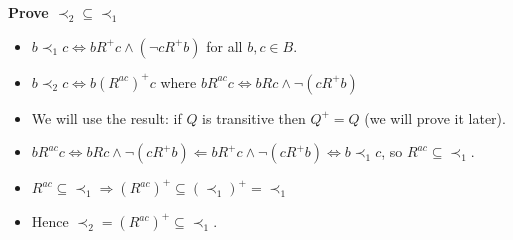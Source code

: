 \documentclass[letterpaper, 8pt]{extarticle}
\begin{document}
\begin{multicols*}{3}
    \textbf{Prove $\prec_2 \subseteq \prec_1$}
    \begin{itemize}
        \item
              $b \prec_1 c \Leftrightarrow bR^+ c \land (\lnot c R^+ b)$ for all $b, c \in B$.
        \item
              $b \prec_2 c \Leftrightarrow b(R^{ac})^+ c$ where $bR^{ac}c \Leftrightarrow bRc \land \lnot (c R^+ b)$
        \item
              We will use the result: if $Q$ is transitive then $Q^+ = Q$ (we will prove it later).
        \item
              $bR^{ac} c \Leftrightarrow bRc \land \lnot (c R^+ b) \Leftarrow bR^+ c \land \lnot (c R^+ b) \Leftrightarrow b \prec_1 c$, so $R^{ac} \subseteq \prec_1$.
        \item
              $R^{ac} \subseteq \prec_1 \Rightarrow (R^{ac})^+ \subseteq (\prec_1)^+ = \prec_1$
        \item
              Hence $\prec_2 = (R^{ac})^+ \subseteq \prec_1$.
    \end{itemize}

\end{multicols*}
\end{document}
